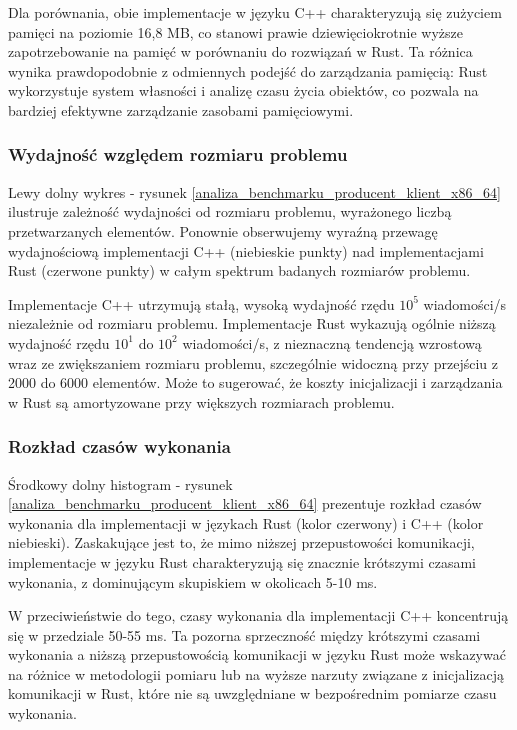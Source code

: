 Dla porównania, obie implementacje w języku C++ charakteryzują się zużyciem pamięci na poziomie 16,8 MB, co stanowi prawie dziewięciokrotnie wyższe zapotrzebowanie na pamięć w porównaniu do rozwiązań w Rust. Ta różnica wynika prawdopodobnie z odmiennych podejść do zarządzania pamięcią: Rust wykorzystuje system własności i analizę czasu życia obiektów, co pozwala na bardziej efektywne zarządzanie zasobami pamięciowymi.

\subsubsection{Wydajność względem rozmiaru problemu}
Lewy dolny wykres - rysunek \ref{analiza_benchmarku_producent_klient_x86_64} ilustruje zależność wydajności od rozmiaru problemu, wyrażonego liczbą przetwarzanych elementów. Ponownie obserwujemy wyraźną przewagę wydajnościową implementacji C++ (niebieskie punkty) nad implementacjami Rust (czerwone punkty) w całym spektrum badanych rozmiarów problemu.

Implementacje C++ utrzymują stałą, wysoką wydajność rzędu $10^5$ wiadomości/s niezależnie od rozmiaru problemu. Implementacje Rust wykazują ogólnie niższą wydajność rzędu $10^1$ do $10^2$ wiadomości/s, z nieznaczną tendencją wzrostową wraz ze zwiększaniem rozmiaru problemu, szczególnie widoczną przy przejściu z 2000 do 6000 elementów. Może to sugerować, że koszty inicjalizacji i zarządzania w Rust są amortyzowane przy większych rozmiarach problemu.



\subsubsection{Rozkład czasów wykonania}
Środkowy dolny histogram - rysunek \ref{analiza_benchmarku_producent_klient_x86_64} prezentuje rozkład czasów wykonania dla implementacji w językach Rust (kolor czerwony) i C++ (kolor niebieski). Zaskakujące jest to, że mimo niższej przepustowości komunikacji, implementacje w języku Rust charakteryzują się znacznie krótszymi czasami wykonania, z dominującym skupiskiem w okolicach 5-10 ms.

W przeciwieństwie do tego, czasy wykonania dla implementacji C++ koncentrują się w przedziale 50-55 ms. Ta pozorna sprzeczność między krótszymi czasami wykonania a niższą przepustowością komunikacji w języku Rust może wskazywać na różnice w metodologii pomiaru lub na wyższe narzuty związane z inicjalizacją komunikacji w Rust, które nie są uwzględniane w bezpośrednim pomiarze czasu wykonania.

